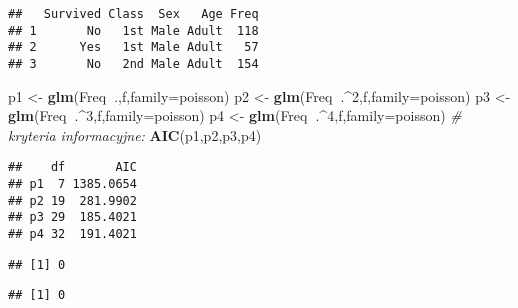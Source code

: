 \documentclass[polish,]{book}
\newenvironment{Shaded}{\begin{snugshade}}{\end{snugshade}}
\newcommand{\CommentTok}[1]{\textcolor[rgb]{0.56,0.35,0.01}{\textit{#1}}}
\newcommand{\DataTypeTok}[1]{\textcolor[rgb]{0.13,0.29,0.53}{#1}}
\newcommand{\DecValTok}[1]{\textcolor[rgb]{0.00,0.00,0.81}{#1}}
\newcommand{\KeywordTok}[1]{\textcolor[rgb]{0.13,0.29,0.53}{\textbf{#1}}}
\newcommand{\NormalTok}[1]{#1}
\newcommand{\OperatorTok}[1]{\textcolor[rgb]{0.81,0.36,0.00}{\textbf{#1}}}
\newcommand{\StringTok}[1]{\textcolor[rgb]{0.31,0.60,0.02}{#1}}
\begin{document}
\begin{verbatim}
##   Survived Class  Sex   Age Freq
## 1       No   1st Male Adult  118
## 2      Yes   1st Male Adult   57
## 3       No   2nd Male Adult  154
\end{verbatim}

\begin{Shaded}
\begin{Highlighting}[]
\NormalTok{p1 <-}\StringTok{ }\KeywordTok{glm}\NormalTok{(Freq}\OperatorTok{~}\NormalTok{.,f,}\DataTypeTok{family=}\NormalTok{poisson)}
\NormalTok{p2 <-}\StringTok{ }\KeywordTok{glm}\NormalTok{(Freq}\OperatorTok{~}\NormalTok{.}\OperatorTok{^}\DecValTok{2}\NormalTok{,f,}\DataTypeTok{family=}\NormalTok{poisson)}
\NormalTok{p3 <-}\StringTok{ }\KeywordTok{glm}\NormalTok{(Freq}\OperatorTok{~}\NormalTok{.}\OperatorTok{^}\DecValTok{3}\NormalTok{,f,}\DataTypeTok{family=}\NormalTok{poisson)}
\NormalTok{p4 <-}\StringTok{ }\KeywordTok{glm}\NormalTok{(Freq}\OperatorTok{~}\NormalTok{.}\OperatorTok{^}\DecValTok{4}\NormalTok{,f,}\DataTypeTok{family=}\NormalTok{poisson)}
\CommentTok{# kryteria informacyjne:}
\KeywordTok{AIC}\NormalTok{(p1,p2,p3,p4)}
\end{Highlighting}
\end{Shaded}

\begin{verbatim}
##    df       AIC
## p1  7 1385.0654
## p2 19  281.9902
## p3 29  185.4021
## p4 32  191.4021
\end{verbatim}

\begin{Shaded}
\end{Shaded}

\begin{verbatim}
## [1] 0
\end{verbatim}

\begin{Shaded}
\end{Shaded}

\begin{verbatim}
## [1] 0
\end{verbatim}
\end{document}
